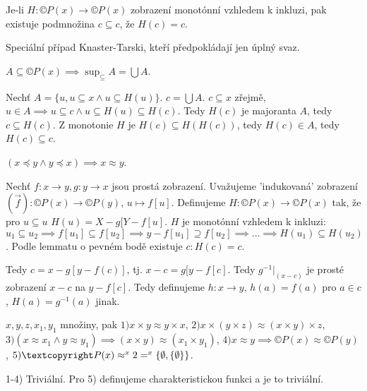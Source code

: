 \documentclass[12pt]{article}                   %
\begin{document}
    \begin{lemma}
        Je-li $H: ©P(x) \rightarrow ©P(x)$ zobrazení monotónní vzhledem k inkluzi, pak existuje podmnožina $c \subseteq c$, že $H(c) = c$.

        \begin{poznamkain}
            Speciální případ Knaster-Tarski, kteří předpokládají jen úplný svaz.
        \end{poznamkain}

        \begin{pozorovaniin}
            $A \subseteq ©P(x) \implies \sup_{\subseteq} A = \bigcup A$.
        \end{pozorovaniin}

        \begin{dukazin}
            Nechť $A = \{u, u \subseteq x \land u \subseteq H(u)\}$. $c = \bigcup A$. $c \subseteq x$ zřejmě, $u \in A \implies u \subseteq c \land u \subseteq H(u) \subseteq H(c)$. Tedy $H(c)$ je majoranta $A$, tedy $c \subseteq H(c)$. Z monotonie $H$ je $H(c) \subseteq H(H(c))$, tedy $H(c) \in A$, tedy $H(c)\subseteq c$.
        \end{dukazin}
    \end{lemma}

    \begin{veta}
        $(x \preceq y \land y \preceq x) \implies x \approx y$.
        
        \begin{dukazin}
            Nechť $f: x \rightarrow y, g: y \rightarrow x$ jsou prostá zobrazení. Uvažujeme 'indukovaná' zobrazení $(\vec{f}) : ©P(x) \rightarrow ©P(y)$, $u \mapsto f[u]$. Definujeme $H: ©P(x) \rightarrow ©P(x)$ tak, že pro $u \subseteq u$ $H(u) = X - g[Y-f[u]$. $H$ je monotónní vzhledem k inkluzi: $u_1 \subseteq u_2 \implies f[u_1] \subseteq f[u_2] \implies y - f[u_1] \supseteq f[u_2] \implies … \implies H(u_1) \subseteq H(u_2)$. Podle lemmatu o pevném bodě existuje $c: H(c) = c$.

            Tedy $c = x - g[y - f(c)]$, tj. $x - c = g[y - f[c]$. Tedy $g^{-1}|_{(x - c)}$ je prosté zobrazení $x - c$ na $y - f[c]$. Tedy definujeme $h: x \rightarrow y$, $h(a) = f(a)$ pro $a \in c$, $H(a) = g^{-1}(a)$ jinak.
        \end{dukazin}
    \end{veta}

    \begin{lemma}
        $x, y, z, x_1, y_1$ množiny, pak $1) x\times y \approx y \times x$, $2) x \times (y \times z) \approx (x \times y) \times z$, $3) (x \approx x_1 \land y \approx y_1) \implies (x\times y) \approx (x_1 \times y_1)$, $4) x \approx y \implies ©P(x) \approx ©P(y)$, $5) ©P(x) \approx ^x2 = ^x\{\O, \{\O\}\}$.

        \begin{dukazin}
            1-4) Triviální. Pro 5) definujeme charakteristickou funkci a je to triviální.
        \end{dukazin}
    \end{lemma}
\end{document}
